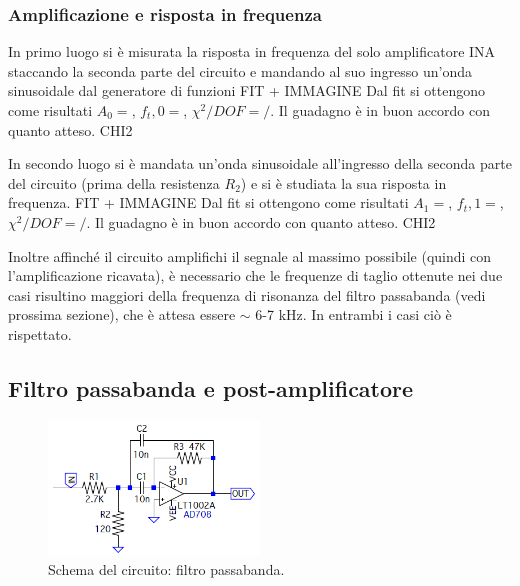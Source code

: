 \documentclass[a4paper,10pt]{article}
\begin{document}
\subsubsection*{Amplificazione e risposta in frequenza}

\lipsum[4]


In primo luogo si è misurata la risposta in frequenza del solo amplificatore INA staccando la seconda parte del circuito e mandando al suo ingresso un'onda sinusoidale dal generatore di funzioni%
FIT + IMMAGINE
Dal fit si ottengono come risultati $A_0 = $, $f_t,0 = $, $\chi^2/DOF = /$. Il guadagno è in buon accordo con quanto atteso. 
CHI2

In secondo luogo si è mandata un'onda sinusoidale all'ingresso della seconda parte del circuito (prima della resistenza $R_2$) e si è studiata la sua risposta in frequenza.
FIT + IMMAGINE
Dal fit si ottengono come risultati $A_1 = $, $f_t,1 = $, $\chi^2/DOF = /$. Il guadagno è in buon accordo con quanto atteso. 
CHI2

Inoltre affinché il circuito amplifichi il segnale al massimo possibile (quindi con l'amplificazione ricavata), è necessario che le frequenze di taglio ottenute nei due casi risultino maggiori della frequenza di risonanza del filtro passabanda (vedi prossima sezione), che è attesa essere $\sim$ 6-7 kHz. In entrambi i casi ciò è rispettato.






\subsection{Filtro passabanda e post-amplificatore}

\begin{figure}
	\vspace{-10pt}
	\centering
	\includegraphics[width=0.5\textwidth]{../grafici/Bandpass.png}
	\vspace{-12pt}
	\caption{Schema del circuito: filtro passabanda.}
	\label{fig:powamp}
	\vspace{-6pt}
\end{figure}
\end{document}
